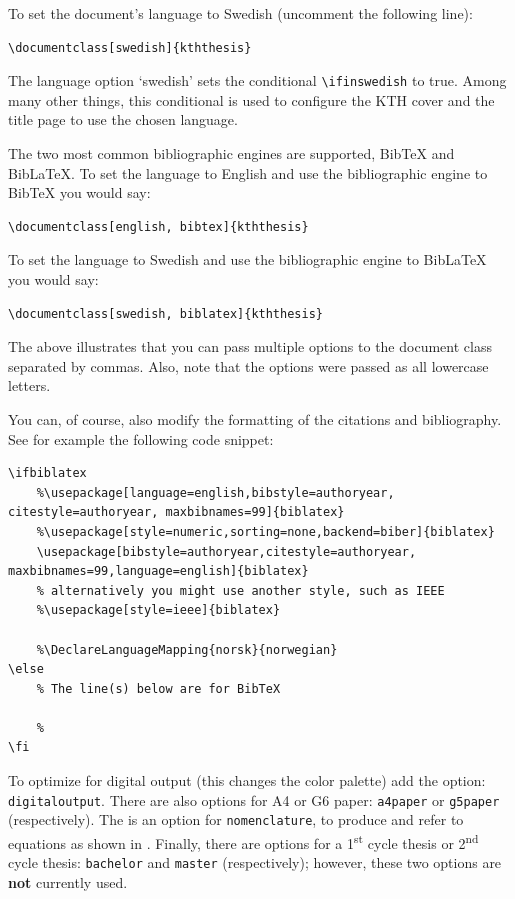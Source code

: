 \documentclass[examplethesis.tex]{subfiles}
\begin{document}
To set the document's language to Swedish (uncomment the following line):
\begin{lstlisting}[style=latexExampleForAuthors]
\documentclass[swedish]{kththesis}
\end{lstlisting}

The language option `swedish' sets the conditional \texttt{\textbackslash ifinswedish} to true.  Among many other things, this conditional is used to configure the KTH cover and the title page to use the chosen language.

The two most common bibliographic engines are supported, \ie BibTeX and BibLaTeX. To set the language to English and use the bibliographic engine to BibTeX you would say:
\begin{lstlisting}[style=latexExampleForAuthors]
\documentclass[english, bibtex]{kththesis}
\end{lstlisting}
To set the language to Swedish and use the bibliographic engine to BibLaTeX you would say:
\begin{lstlisting}[style=latexExampleForAuthors]
\documentclass[swedish, biblatex]{kththesis}
\end{lstlisting}

The above illustrates that you can pass multiple options to the document class separated by commas. Also, note that the options were passed as all lowercase letters.

You can, of course, also modify the formatting of the citations and bibliography. See for example the following code snippet:

\begin{lstlisting}[style=latexExampleForAuthors]
\ifbiblatex
    %\usepackage[language=english,bibstyle=authoryear, citestyle=authoryear, maxbibnames=99]{biblatex}
    %\usepackage[style=numeric,sorting=none,backend=biber]{biblatex}
    \usepackage[bibstyle=authoryear,citestyle=authoryear, maxbibnames=99,language=english]{biblatex}
    % alternatively you might use another style, such as IEEE
    %\usepackage[style=ieee]{biblatex}
    
    %\DeclareLanguageMapping{norsk}{norwegian}
\else
    % The line(s) below are for BibTeX
    
    %
\fi
\end{lstlisting}

To optimize for digital output (this changes the color palette) add the option: \texttt{digitaloutput}. There are also options for A4 or G6 paper: \texttt{a4paper} or \texttt{g5paper} (respectively). The is an option for \texttt{nomenclature}, to produce and refer to equations
\ifnomenclature
as shown in 
\fi
.  Finally, there are options for a 1\textsuperscript{st} cycle thesis or 2\textsuperscript{nd} cycle thesis: \texttt{bachelor} and \texttt{master} (respectively); however, these two options are \textbf{not} currently used.
\end{document}
